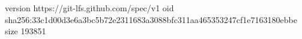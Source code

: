 version https://git-lfs.github.com/spec/v1
oid sha256:33c1d00d3e6a3bc5b72e2311683a3088bfc311aa465353247cf1e7163180ebbe
size 193851
